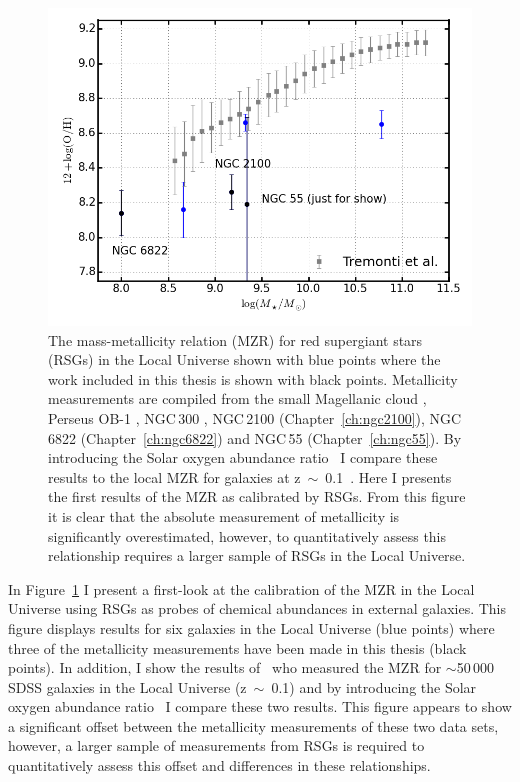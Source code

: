 \begin{figure}
 \centering
\includegraphics[width=\textwidth]{conclusions/MZR-RSGs}
\caption[Mass-metallicity relation from red supergiant stars]{
The mass-metallicity relation (MZR) for red supergiant stars (RSGs) in the Local Universe shown with blue points where the work included in this thesis is shown with black points.
Metallicity measurements are compiled from the small Magellanic cloud
\protect\citep{2015ApJ...806...21D}, Perseus OB-1
\protect\citep{2014ApJ...788...58G}, NGC\,300
\protect\citep{2015ApJ...805..182G},
NGC\,2100 (Chapter~\ref{ch:ngc2100}),
NGC\,6822 (Chapter~\ref{ch:ngc6822})
and NGC\,55 (Chapter~\ref{ch:ngc55}).
By introducing the Solar oxygen abundance ratio~\citep[12 + $\log$ (0/H)$_{\odot}$~=~8.69][]{2009ARA&A..47..481A} I compare these results to the local MZR for galaxies at z~$\sim$~0.1~\citep{Tremonti04}.
Here I presents the first results of the MZR as calibrated by RSGs.
From this figure it is clear that the absolute measurement of metallicity is significantly overestimated, however, to quantitatively assess this relationship requires a larger sample of RSGs in the Local Universe.
\label{fig:concMZR}
         }
\end{figure}

In Figure~\ref{fig:concMZR} I present a first-look at the calibration of the MZR in the Local Universe using RSGs as probes of chemical abundances in external galaxies.
This figure displays results for six galaxies in the Local Universe (blue points) where three of the metallicity measurements have been made in this thesis (black points).
In addition, I show the results of~\cite{Tremonti04} who measured the MZR for $\sim$50\,000 SDSS galaxies in the Local Universe (z~$\sim$~0.1) and by introducing the Solar oxygen abundance ratio~\citep[12 + $\log$ (0/H)$_{\odot}$~=~8.69][]{2009ARA&A..47..481A} I compare these two results.
This figure appears to show a significant offset between the metallicity measurements of these two data sets, however, a larger sample of measurements from RSGs is required to quantitatively assess this offset and differences in these relationships.


